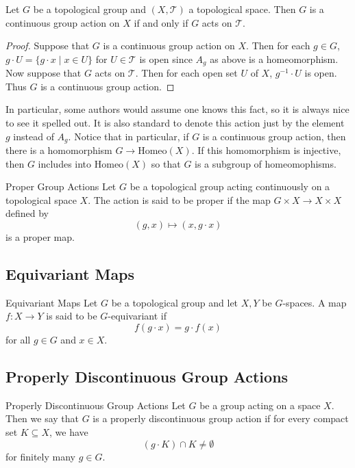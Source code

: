 \documentclass[a4paper]{article}
\begin{document}
\begin{prp}{}{} Let $G$ be a topological group and $(X,\mathcal{T})$ a topological space. Then $G$ is a continuous group action on $X$ if and only if $G$ acts on $\mathcal{T}$. \tcbline
\begin{proof}
Suppose that $G$ is a continuous group action on $X$. Then for each $g\in G$, $g\cdot U=\{g\cdot x\;|\; x\in U\}$ for $U\in\mathcal{T}$ is open since $A_g$ as above is a homeomorphism. Now suppose that $G$ acts on $\mathcal{T}$. Then for each open set $U$ of $X$, $g^{-1}\cdot U$ is open. Thus $G$ is a continuous group action. 
\end{proof}
\end{prp}

In particular, some authors would assume one knows this fact, so it is always nice to see it spelled out. It is also standard to denote this action just by the element $g$ instead of $A_g$. Notice that in particular, if $G$ is a continuous group action, then there is a homomorphism $G\to\text{Homeo}(X)$. If this homomorphism is injective, then $G$ includes into $\text{Homeo}(X)$ so that $G$ is a subgroup of homeomophisms. 

\begin{defn}{Proper Group Actions}{} Let $G$ be a topological group acting continuously on a topological space $X$. The action is said to be proper if the map $G\times X\to X\times X$ defined by $$(g,x)\mapsto(x,g\cdot x)$$ is a proper map. 
\end{defn}

\subsection{Equivariant Maps}
\begin{defn}{Equivariant Maps}{} Let $G$ be a topological group and let $X,Y$ be $G$-spaces. A map $f:X\to Y$ is said to be $G$-equivariant if $$f(g\cdot x)=g\cdot f(x)$$ for all $g\in G$ and $x\in X$. 
\end{defn}

\subsection{Properly Discontinuous Group Actions}
\begin{defn}{Properly Discontinuous Group Actions}{} Let $G$ be a group acting on a space $X$. Then we say that $G$ is a properly discontinuous group action if for every compact set $K\subseteq X$, we have $$(g\cdot K)\cap K\neq\emptyset$$ for finitely many $g\in G$. 
\end{defn}
\end{document}
